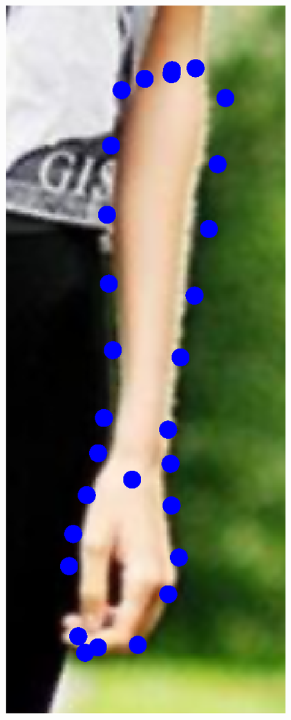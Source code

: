 \begin{figure}[t!]
    \newcommand{\ofh}{0.24\columnwidth}
    \centering
    \includegraphics[height=\ofh]{resources/Fittings/1.eps}

\end{figure}
